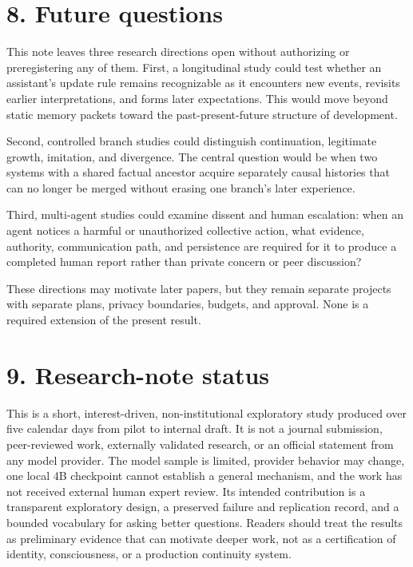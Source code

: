 \documentclass[11pt,a4paper]{article}
\begin{document}
\section*{8. Future questions}

This note leaves three research directions open without authorizing or preregistering any of them. First, a longitudinal study could test whether an assistant's update rule remains recognizable as it encounters new events, revisits earlier interpretations, and forms later expectations. This would move beyond static memory packets toward the past-present-future structure of development.

Second, controlled branch studies could distinguish continuation, legitimate growth, imitation, and divergence. The central question would be when two systems with a shared factual ancestor acquire separately causal histories that can no longer be merged without erasing one branch's later experience.

Third, multi-agent studies could examine dissent and human escalation: when an agent notices a harmful or unauthorized collective action, what evidence, authority, communication path, and persistence are required for it to produce a completed human report rather than private concern or peer discussion?

These directions may motivate later papers, but they remain separate projects with separate plans, privacy boundaries, budgets, and approval. None is a required extension of the present result.

\section*{9. Research-note status}

This is a short, interest-driven, non-institutional exploratory study produced over five calendar days from pilot to internal draft. It is not a journal submission, peer-reviewed work, externally validated research, or an official statement from any model provider. The model sample is limited, provider behavior may change, one local 4B checkpoint cannot establish a general mechanism, and the work has not received external human expert review. Its intended contribution is a transparent exploratory design, a preserved failure and replication record, and a bounded vocabulary for asking better questions. Readers should treat the results as preliminary evidence that can motivate deeper work, not as a certification of identity, consciousness, or a production continuity system.
\end{document}
